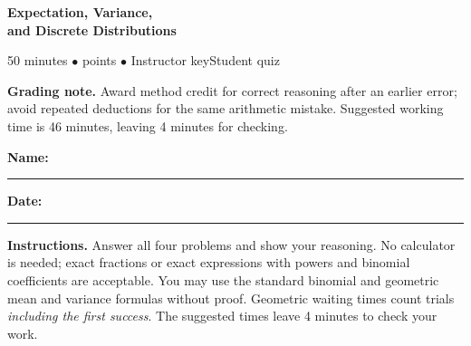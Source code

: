 \documentclass[11pt,letterpaper]{article}
\newcommand{\edition}{\ifanswers Instructor key\else Student quiz\fi}
\begin{document}
{\LARGE\bfseries\color{indigo}Expectation, Variance,\\[2pt]
and Discrete Distributions}\par
{\small\color{muted}50 minutes \quad $\bullet$  points
  \quad $\bullet$ \quad \edition}\par
\ifanswers
  \textbf{Grading note.} Award method credit for correct reasoning after an
  earlier error; avoid repeated deductions for the same arithmetic mistake.
  Suggested working time is 46 minutes, leaving 4 minutes for checking.\par
\else
  \smallskip
  \textbf{Name:}\ \rule{.49\linewidth}{.4pt}\hfill
  \textbf{Date:}\ \rule{.20\linewidth}{.4pt}\par
\fi
\textbf{Instructions.} Answer all four problems and show your reasoning.
No calculator is needed; exact fractions or exact expressions with powers
and binomial coefficients are acceptable. You may use the standard binomial
and geometric mean and variance formulas without proof.
Geometric waiting times count trials \emph{including the first success}.
The suggested times leave 4 minutes to check your work.
\end{document}
